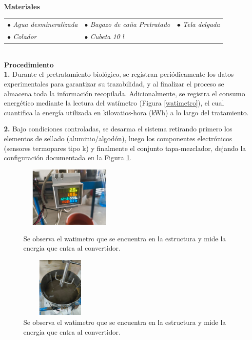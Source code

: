 \documentclass[12pt]{article}
\begin{document}
			 \textbf{Materiales}
			\\[0.5em]
		
			\begin{tabular}{p{0.3\textwidth}p{}p{}}
				$\bullet$ \textit{Agua desmineralizada} & $\bullet$ \textit{ Bagazo de caña Pretratado} & $\bullet$ \textit{Tela delgada}  \\
			
				$\bullet$ \textit{Colador} & $\bullet$ \textit{Cubeta 10 l} & 
			\end{tabular}
			\\[0.5em]
			
			
			\textbf{Procedimiento}
			\\[0.5em] 
			\textbf{1.} Durante el pretratamiento biológico, se registran periódicamente los datos experimentales para garantizar su trazabilidad, y al finalizar el proceso se almacena toda la información recopilada. Adicionalmente, se registra el consumo energético mediante la lectura del watímetro (Figura \ref{watimetro}), el cual cuantifica la energía utilizada en kilovatios-hora (kWh) a lo largo del tratamiento.
			
			
			\textbf{2.} Bajo condiciones controladas, se desarma el sistema retirando primero los elementos de sellado (aluminio/algodón), luego los componentes electrónicos (sensores termopares tipo k) y finalmente el conjunto tapa-mezclador, dejando la configuración documentada en la Figura \ref{biologico1}.
	
			
					
			\begin{figure}[H]
				\centering
				\begin{minipage}{0.46\textwidth}
					\centering
					\includegraphics[width=5cm, height=3cm]{imagenes/watimetro} %
					\caption{Se observa el watimetro que se encuentra en la estructura y mide la energia que entra al convertidor.}
						\label{watimetro}
					\end{minipage}
					\hfill
					\begin{minipage}{0.48\textwidth}
						\centering
						\includegraphics[width=4cm, height=3cm]{imagenes/biologico1} %
						\caption{Se observa el watimetro que se encuentra en la estructura y mide la energia que entra al convertidor.}
						\label{biologico1}
					\end{minipage}
				\end{figure}
				
\end{document}
